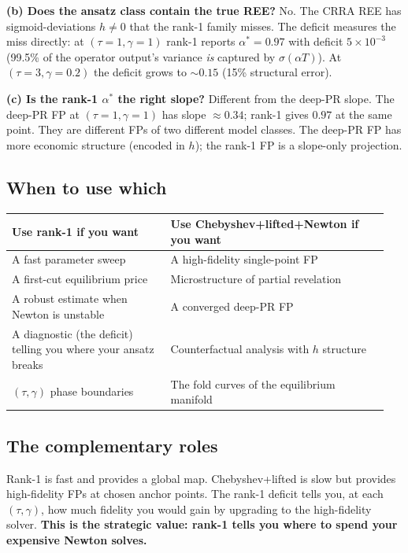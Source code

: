 \documentclass[11pt]{article}
\begin{document}
\textbf{(b) Does the ansatz class contain the true REE?} No. The CRRA REE has
sigmoid-deviations $h\neq 0$ that the rank-1 family misses. The deficit measures the
miss directly: at $(\tau{=}1,\gamma{=}1)$ rank-1 reports $\alpha^*=0.97$ with deficit
$5\times 10^{-3}$ (99.5\% of the operator output's variance \emph{is} captured by
$\sigma(\alpha T)$). At $(\tau{=}3,\gamma{=}0.2)$ the deficit grows to $\sim 0.15$
(15\% structural error).

\textbf{(c) Is the rank-1 $\alpha^*$ the right slope?} Different from the deep-PR slope.
The deep-PR FP at $(\tau{=}1,\gamma{=}1)$ has slope $\approx 0.34$; rank-1 gives $0.97$
at the same point. They are different FPs of two different model classes. The
deep-PR FP has more economic structure (encoded in $h$); the rank-1 FP is a
slope-only projection.

\subsection{When to use which}

\begin{center}\begin{tabular}{p{0.4\linewidth}p{0.55\linewidth}}\toprule
\textbf{Use rank-1 if you want} & \textbf{Use Chebyshev+lifted+Newton if you want} \\\midrule
A fast parameter sweep & A high-fidelity single-point FP \\
A first-cut equilibrium price & Microstructure of partial revelation \\
A robust estimate when Newton is unstable & A converged deep-PR FP \\
A diagnostic (the deficit) telling you where your ansatz breaks & Counterfactual analysis with $h$ structure \\
$(\tau, \gamma)$ phase boundaries & The fold curves of the equilibrium manifold \\
\bottomrule\end{tabular}\end{center}

\subsection{The complementary roles}

Rank-1 is fast and provides a global map. Chebyshev+lifted is slow but provides
high-fidelity FPs at chosen anchor points. The rank-1 deficit tells you, at each
$(\tau,\gamma)$, how much fidelity you would gain by upgrading to the high-fidelity
solver. \textbf{This is the strategic value: rank-1 tells you where to spend your
expensive Newton solves.}
\end{document}
